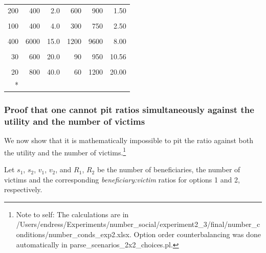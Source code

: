 \documentclass[
]{article}
\begin{document}
\begin{longtable}[t]{rrrrrr}
\hspace{1em}200 & 400 & 2.0 & 600 & 900 & 1.50\\
\hspace{1em}\cellcolor{gray!10}{10} & \cellcolor{gray!10}{30} & \cellcolor{gray!10}{3.0} & \cellcolor{gray!10}{30} & \cellcolor{gray!10}{60} & \cellcolor{gray!10}{2.00}\\
\hspace{1em}100 & 400 & 4.0 & 300 & 750 & 2.50\\
\hspace{1em}\cellcolor{gray!10}{30} & \cellcolor{gray!10}{300} & \cellcolor{gray!10}{10.0} & \cellcolor{gray!10}{90} & \cellcolor{gray!10}{500} & \cellcolor{gray!10}{5.56}\\
\hspace{1em}400 & 6000 & 15.0 & 1200 & 9600 & 8.00\\
\hspace{1em}\cellcolor{gray!10}{2} & \cellcolor{gray!10}{40} & \cellcolor{gray!10}{20.0} & \cellcolor{gray!10}{6} & \cellcolor{gray!10}{60} & \cellcolor{gray!10}{10.00}\\
\hspace{1em}30 & 600 & 20.0 & 90 & 950 & 10.56\\
\hspace{1em}\cellcolor{gray!10}{400} & \cellcolor{gray!10}{12000} & \cellcolor{gray!10}{30.0} & \cellcolor{gray!10}{1200} & \cellcolor{gray!10}{19000} & \cellcolor{gray!10}{15.83}\\
\hspace{1em}20 & 800 & 40.0 & 60 & 1200 & 20.00\\*
\end{longtable}

\subsubsection{Proof that one cannot pit ratios simultaneously against the utility and the number of victims}\label{app:proofs}

We now show that it is mathematically impossible to pit the ratio against both the utility and the number of victims.\footnote{Note to self: The calculations are in /Users/endress/Experiments/number\_social/experiment2\_3/final/number\_conditions/number\_conds\_exp2.xlsx. Option order counterbalancing was done automatically in parse\_scenarios\_2x2\_choices.pl.}

Let \(s_1\), \(s_2\), \(v_1\), \(v_2\), and \(R_1\), \(R_2\) be the number of beneficiaries, the number of victims and the corresponding \emph{beneficiary:victim} ratios for options 1 and 2, respectively.
\end{document}
